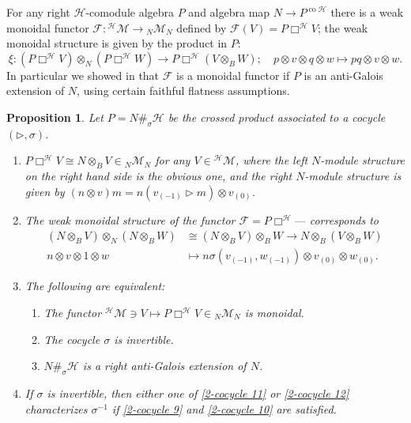 \documentclass[a4paper,reqno]{amsart}
\numberwithin{equation}{section}
\theoremstyle{plain}
\newtheorem{prop}[thm]{Proposition}
\theoremstyle{remark}
\numberwithin{equation}{section}
\newcommand\inv{^{-1}}
\newcommand{\ot}{\otimes}
\newcommand{\z}{{}_{\scriptscriptstyle{(0)}}}
\newcommand{\mo}{{}_{\scriptscriptstyle{(-1)}}}
\newcommand\ou[1]{\otimes_{#1}}
\newcommand{\la}{{\triangleright}}
\newcommand{\CH}{\mathcal{H}}
\newcommand\co{{\operatorname{co}}}
\newcommand\LComod[1]{{^{#1}}\mathcal M}
\newcommand\BiMod[1]{{}_{#1}\mathcal M_{#1}}
\begin{document}
For any right $\CH$-comodule algebra $P$ and algebra map $N\to P^{\co\CH}$ there is a weak monoidal functor $\mathcal F\colon\LComod\CH\to\BiMod N$ defined by $\mathcal F(V)=P\Box^\CH V$; the weak monoidal structure is given by the product in $P$:
\[\xi\colon (P\Box^\CH V)\ou N(P\Box^\CH W)\to P\Box^\CH(V\ou BW);\quad p\ot v\ot q\ot w\mapsto pq\ot v\ot w.\]
In particular we showed in \cite[Thm.~3.31]{HS25} that $\mathcal F$ is a monoidal functor if $P$ is an anti-Galois extension of $N$, using certain faithful flatness assumptions.
\begin{prop}\label{monoidal functor}
    Let $P=N\#_\sigma\CH$ be the crossed product associated to a cocycle $(\la,\sigma)$.
    \begin{enumerate}
        \item $P\Box^\CH V\cong N\ou BV\in\BiMod N$ for any $V\in\LComod\CH$, where the left $N$-module structure on the right hand side is the obvious one, and the right $N$-module structure is given by $(n\ot v)m=n(v\mo\la m)\ot v\z$.
        \item The weak monoidal structure of the functor $\mathcal F=P\Box^\CH\text{---}$ corresponds to 
        \begin{align*}
        (N\ou BV)\ou N(N\ou BW)&\cong (N\ou BV)\ou BW\to N\ou B (V\ou BW) \\n\ot v\ot 1\ot w&\mapsto n\sigma(v\mo,w\mo)\ot v\z\ot w\z.
        \end{align*}
        \item The following are equivalent:
        \begin{enumerate}
            \item The functor $\LComod \CH\ni V\mapsto P\Box^\CH V\in\BiMod N$ is monoidal.
            \item The cocycle $\sigma$ is invertible.
            \item $N\#_\sigma\CH$ is a right anti-Galois extension of $N$.
        \end{enumerate}
        \item If $\sigma$ is invertible, then either one of \eqref{2-cocycle 11} or \eqref{2-cocycle 12} characterizes $\sigma\inv$ if \eqref{2-cocycle 9} and \eqref{2-cocycle 10} are satisfied. 
     \end{enumerate}
\end{prop}
\end{document}
